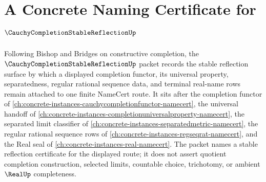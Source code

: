\chapter{A Concrete Naming Certificate for $\CauchyCompletionStableReflectionUp$}
\label{ch:concrete-instances-cauchy-completion-stable-reflection-namecert}

Following Bishop and Bridges on constructive completion, the $\CauchyCompletionStableReflectionUp$ packet records the stable reflection surface by which a displayed completion functor, its universal property, separatedness, regular rational sequence data, and terminal real-name rows remain attached to one finite NameCert route. It sits after the completion functor of \autoref{ch:concrete-instances-cauchycompletionfunctor-namecert}, the universal handoff of \autoref{ch:concrete-instances-completionuniversalproperty-namecert}, the separated limit classifier of \autoref{ch:concrete-instances-separatedmetric-namecert}, the regular rational sequence rows of \autoref{ch:concrete-instances-regseqrat-namecert}, and the Real seal of \autoref{ch:concrete-instances-real-namecert}. The packet names a stable reflection certificate for the displayed route; it does not assert quotient completion construction, selected limits, countable choice, trichotomy, or ambient $\RealUp$ completeness.

